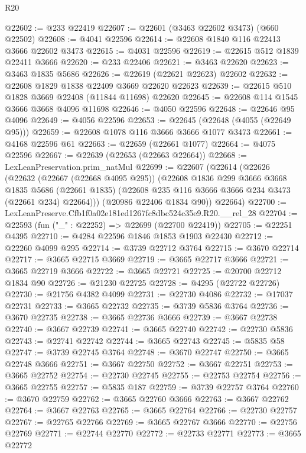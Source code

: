 \begin{lexlean}{R20}
\begin{coremodule}
@22602 := @233 @22419
@22607 := @22601 (@3463 @22602 @3473) (@660 @22502)
@22608 := @4041 @22596
@22614 := @22608 @1840 @116 @22413 @3666 @22602 @3473
@22615 := @4031 @22596
@22619 := @22615 @512 @1839 @22411 @3666
@22620 := @233 @22406
@22621 := @3463 @22620
@22623 := @3463 @1835 @5686
@22626 := @22619 (@22621 @22623) @22602
@22632 := @22608 @1829 @1838 @22409 @3669 @22620 @22623
@22639 := @22615 @510 @1828 @3669 @22408 (@11844 @11698) @22620
@22645 := @22608 @114 @1545 @3666 @3668 @4096 @11698
@22646 := @4050 @22596
@22648 := @22646 @95 @4096
@22649 := @4056 @22596
@22653 := @22645 (@22648 (@4055 (@22649 @95)))
@22659 := @22608 @1078 @116 @3666 @3666 @1077 @3473
@22661 := @4168 @22596 @61
@22663 := @22659 (@22661 @1077)
@22664 := @4075 @22596
@22667 := @22639 (@22653 (@22663 @22664))
@22668 := LexLeanPreservation.prim_natMul
@22699 := @22607
    (@22614
      (@22626
        (@22632
          (@22667 (@22668 @4095 @295))
          (@22608
            @1836
            @299
            @3666
            @3668
            @1835
            @5686
            (@22661 @1835)
            (@22608 @235 @116 @3666 @3666 @234 @3473 (@22661 @234) @22664)))
        (@20986 @22406 @1834 @90))
      @22664)
@22700 := LexLeanPreserve.Cfb1f0a02e181ed1267fc8dbc524c35e9.R20.__rel_28
@22704 := @22593 (fun ("_" : @22252) => @22699 (@22700 @22419))
@22705 := @22251 @4395
@22710 := @4284 @22596 @1846 @1853 @1903 @22430
@22712 := @22260 @4099 @295
@22714 := @3739 @22712 @3764
@22715 := @3670 @22714
@22717 := @3665 @22715 @3669
@22719 := @3665 @22717 @3666
@22721 := @3665 @22719 @3666
@22722 := @3665 @22721
@22725 := @20700 @22712 @1834 @90
@22726 := @21230 @22725
@22728 := @4295 (@22722 @22726)
@22730 := @21756 @4382 @4099
@22731 := @22730 @4086
@22732 := @17037 @22731
@22733 := @3665 @22732
@22735 := @3739 @5836 @3764
@22736 := @3670 @22735
@22738 := @3665 @22736 @3666
@22739 := @3667 @22738
@22740 := @3667 @22739
@22741 := @3665 @22740
@22742 := @22730 @5836
@22743 := @22741 @22742
@22744 := @3665 @22743
@22745 := @5835 @58
@22747 := @3739 @22745 @3764
@22748 := @3670 @22747
@22750 := @3665 @22748 @3666
@22751 := @3667 @22750
@22752 := @3667 @22751
@22753 := @3665 @22752
@22754 := @22730 @22745
@22755 := @22753 @22754
@22756 := @3665 @22755
@22757 := @5835 @187
@22759 := @3739 @22757 @3764
@22760 := @3670 @22759
@22762 := @3665 @22760 @3666
@22763 := @3667 @22762
@22764 := @3667 @22763
@22765 := @3665 @22764
@22766 := @22730 @22757
@22767 := @22765 @22766
@22769 := @3665 @22767 @3666
@22770 := @22756 @22769
@22771 := @22744 @22770
@22772 := @22733 @22771
@22773 := @3665 @22772

\end{coremodule}
\end{lexlean}
